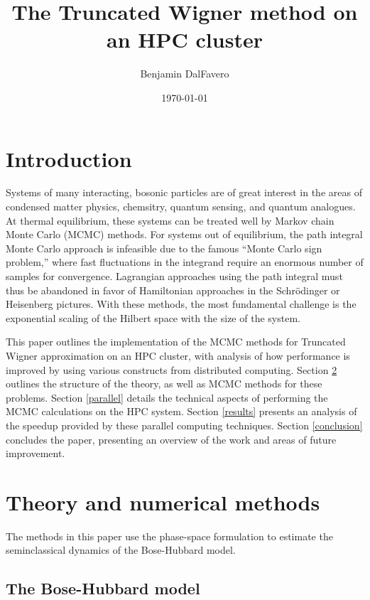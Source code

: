 \documentclass{article}
\title{The Truncated Wigner method on an HPC cluster}
\author{Benjamin DalFavero}
\date{\today}
\newcommand{\Schroedinger}{Schr{\"o}dinger}
\begin{document}
\maketitle

\section{Introduction} \label{introduction}

Systems of many interacting, bosonic particles are of great interest in the areas of condensed matter physics, 
chemsitry, quantum sensing, and quantum analogues. At thermal equilibrium, these systems can be treated well by 
Markov chain Monte Carlo (MCMC) methods. For systems out of equilibrium, the path integral Monte Carlo approach 
is infeasible due to the famous ``Monte Carlo sign problem,'' where fast fluctuations in the integrand require
an enormous number of samples for convergence. Lagrangian approaches using the path integral must thus be abandoned
in favor of Hamiltonian approaches in the \Schroedinger{} or Heisenberg pictures. With these methods, the most 
fundamental challenge is the exponential scaling of the Hilbert space with the size of the system.

This paper outlines the implementation of the MCMC methods for Truncated Wigner approximation on 
an HPC cluster, with analysis of how performance is improved by using various constructs from distributed
computing. Section \ref{theory-methods} outlines the structure of the theory, as well as MCMC methods for 
these problems. Section \ref{parallel} details the technical aspects of performing the MCMC calculations 
on the HPC system. Section \ref{results} presents an analysis of the speedup provided by these parallel computing 
techniques. Section \ref{conclusion} concludes the paper, presenting an overview of the work and areas of future 
improvement.

\section{Theory and numerical methods} \label{theory-methods}

The methods in this paper use the phase-space formulation to estimate the seminclassical dynamics 
of the Bose-Hubbard model.

\subsection{The Bose-Hubbard model}
\end{document}
